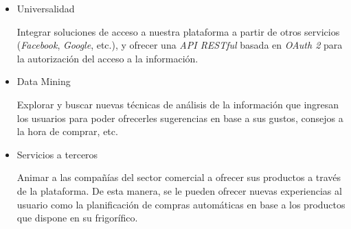 \begin{itemize}

    \item Universalidad

        Integrar soluciones de acceso a nuestra plataforma a partir de otros servicios (\emph{Facebook}, \emph{Google}, etc.), y ofrecer una \emph{API RESTful} basada en \emph{OAuth 2} para la autorización del acceso a la información.

    \item Data Mining

        Explorar y buscar nuevas técnicas de análisis de la información que ingresan los usuarios para poder ofrecerles sugerencias en base a sus gustos, consejos a la hora de comprar, etc.

    \item Servicios a terceros

        Animar a las compañías del sector comercial a ofrecer sus productos a través de la plataforma. De esta manera, se le pueden ofrecer nuevas experiencias al usuario como la planificación de compras automáticas en base a los productos que dispone en su frigorífico.
    \end{itemize}